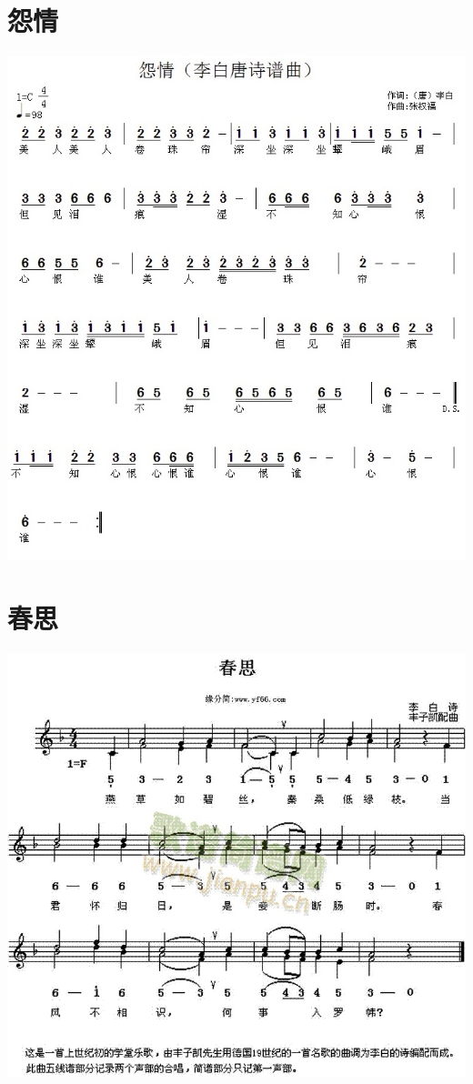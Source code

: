 \documentclass[cn,pad,twocol]{elegantbook}
\begin{document}
\section{怨情}      \includegraphics[width=\textwidth]{dongxiao/20200808-怨情-李白.jpg}
\section{春思}      \includegraphics[width=\textwidth]{dongxiao/20200808-春思-李白.jpg}
\end{document}
